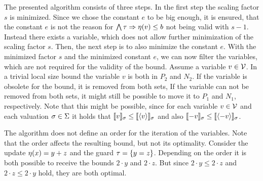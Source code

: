 The presented algorithm consists of three steps.
In the first step the scaling factor $s$ is minimized.
Since we chose the constant $e$ to be big enough, it is ensured, that the constant $e$ is not the reason for $\bigwedge \tau \Rightarrow \eta(v) \leq b$ not being valid with $s-1$.
Instead there exists a variable, which does not allow further minimization of the scaling factor $s$.
Then, the next step is to also minimize the constant $e$.
With the minimized factor $s$ and the minimized constant $e$, we can now filter the variables, which are not required for the validity of the bound.
Assume a variable $v \in \mathcal{V}$.
In a trivial local size bound the variable $v$ is both in $P_2$ and $N_2$.
If the variable is obsolete for the bound, it is removed from both sets, 
If the variable can not be removed from both sets, it might still be possible to move it to $P_1$ and $N_1$, respectively.
Note that this might be possible, since for each variable $v \in \mathcal{V}$ and each valuation $\sigma \in \Sigma$ it holds that $\llbracket v \rrbracket_{\sigma} \leq \llbracket \langle v\rangle \rrbracket_{\sigma}$ and also $\llbracket -v \rrbracket_{\sigma} \leq \llbracket \langle-v\rangle \rrbracket_{\sigma}$.

The algorithm does not define an order for the iteration of the variables.
Note that the order affects the resulting bound, but not its optimality.
Consider the update $\eta(x) = y + z$ and the guard $\tau = \lbrace y = z \rbrace$.
Depending on the order it is both possible to receive the bounds $2 \cdot y$ and $2 \cdot z$.
But since $2 \cdot y \leq 2 \cdot z$ and $2 \cdot z \leq 2 \cdot y$ hold, they are both optimal.

